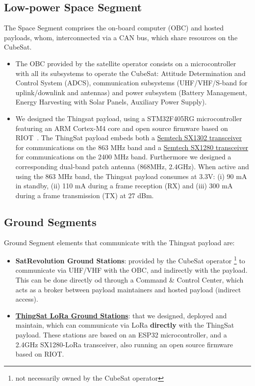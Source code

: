\subsection*{Low-power Space Segment}
The Space Segment comprises the on-board computer (OBC) and hosted payloads, whom,
interconnected via a CAN bus, which share resources on the CubeSat.
\begin{itemize}
\item The OBC provided by the satellite operator consists on
a microcontroller with all its subsystems to operate the CubeSat:
Attitude Determination and Control System (ADCS),
communication subsystems (UHF/VHF/S-band for uplink/downlink and antennas) and
power subsystem (Battery Management, Energy Harvesting with Solar Panels, Auxiliary Power Supply).

\item We designed the Thingsat payload, using a STM32F405RG %
microcontroller featuring an ARM Cortex-M4 core
and open source firmware based on RIOT~\cite{baccelli2018riot}. The ThingSat payload embeds both a
\href{https://www.semtech.com/products/wireless-rf/lora-gateways/sx1302}{Semtech SX1302 transceiver} for
communications on the 863 MHz band and a \href{https://www.semtech.com/products/wireless-rf/24-ghz-transceivers/sx1280}{Semtech SX1280 transceiver}
for communications on the 2400 MHz band. Furthermore we designed a corresponding dual-band patch antenna (868MHz, 2.4GHz).
When active and using the 863 MHz band, the Thingsat payload consumes at 3.3V:
(i) 90 mA in standby,
(ii) 110 mA during a frame reception (RX) and
(iii) 300 mA during a frame transmission (TX) at 27 dBm.
\end{itemize}

\subsection*{Ground Segments}
Ground Segment elements that communicate with the Thingsat payload are:
\begin{itemize}
\item \textbf{SatRevolution Ground Stations}: provided by the CubeSat operator \footnote{not
necessarily owned by the CubeSat operator} to communicate via UHF/VHF with the OBC,
and indirectly with the payload. This can be done directly od through a Command \&
Control Center, which acts as a broker between payload maintainers and hosted payload
(indirect access).
\item \href{https://github.com/thingsat/tinygs_2g4station}{\textbf{ThingSat LoRa Ground Stations}}:
that we designed, deployed and maintain, which can communicate via LoRa \textbf{directly} with the
ThingSat payload. These stations are based on an ESP32 microcontroller, and a 2.4GHz SX1280-LoRa
transceiver, also running an open source firmware based on RIOT.
\end{itemize}

